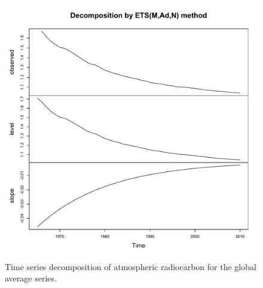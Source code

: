 \documentclass[draft,grl]{agutexSI}
\begin{document}
\begin{figure}[htbp]
   \centering
   \includegraphics[scale=0.7]{Figures/tsG} %
   \caption{Time series decomposition of atmospheric radiocarbon for the global average series. }
   \label{fig:tsG}
\end{figure}

\clearpage

%
%
\end{document}
